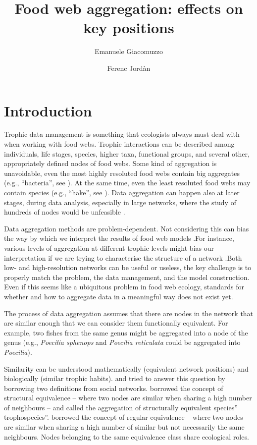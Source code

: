 \documentclass[twocolumn]{article}
\title{Food web aggregation: effects on key positions}
\author[1]{Emanuele Giacomuzzo}
\author[1]{Ferenc Jordàn}
\affil[1]{Stazione Zoologica Anton Dohrn, Napoli, 80122, Italy}
\date{}
\begin{document}
\maketitle
\section*{Introduction}

	Trophic data management is something that ecologists always must deal with when working with food webs. Trophic interactions can be described among individuals, life stages, species, higher taxa, functional groups, and several other, appropriately defined nodes of food webs. Some kind of aggregation is unavoidable, even the most highly resoluted food webs contain big aggregates (e.g., “bacteria'', see \citet{Martinez1991}). At the same time, even the least resoluted food webs may contain species (e.g., “hake”, see \citet{Yodzis1998}). Data aggregation can happen also at later stages, during data analysis, especially in large networks, where the study of hundreds of nodes would be unfeasible \citep{Yodzis1999}.

	Data aggregation methods are problem-dependent. Not considering this can bias the way by which we interpret the results of food web models \citep{Paine1988, Hall1993}.For instance, various levels of aggregation at different trophic levels might bias our interpretation if we are trying to characterise the structure of a network \citep{Yodzis1999}.Both low- and high-resolution networks can be useful or useless, the key challenge is to properly match the problem, the data management, and the model construction. Even if this seems like a ubiquitous problem in food web ecology, standards for whether and how to aggregate data in a meaningful way does not exist yet.

	The process of data aggregation assumes that there are nodes in the network that are similar enough that we can consider them functionally equivalent.
	For example, two fishes from the same genus might be aggregated into a node of the genus (e.g., \emph{Poecilia sphenops} and \emph{Poecilia reticulata} could be aggregated into \emph{Poecilia}).

	Similarity can be understood mathematically (equivalent network positions) and biologically (similar trophic habits).	\citet{Yodzis1999} and \citet{Luczkovich2003} tried to answer this question by borrowing two definitions from social networks. \citet{Yodzis1999} borrowed the concept of structural equivalence – where two nodes are similar when sharing a high number of neighbours – and called the aggregation of structurally equivalent species” trophospecies”.
	\citet{Luczkovich2003} borrowed the concept of regular equivalence – where two nodes are similar when sharing a high number of similar but not necessarily the same neighbours. Nodes belonging to the same equivalence class share ecological roles.
\end{document}
